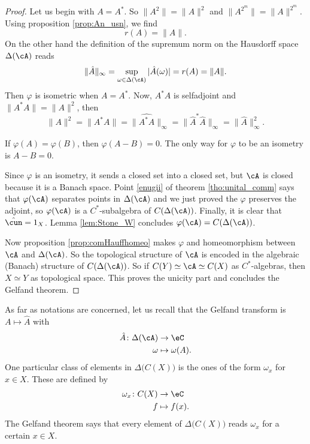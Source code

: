 \begin{proof}

Let us begin with $A=A^*$. So $\|A^2\|=\|A\|^2$ and $\|A^{2^m}\|=\|A\|^{2^m}$. Using proposition \ref{prop:An_usn}, we find
\[ 
  r(A)=\|A\|.
\]
On the other hand the definition of the supremum norm on the Hausdorff space $\Delta(\cA)$ reads
\begin{equation} \label{eq:AinfA }
  \|\hat A\|_{\infty}=\sup_{\omega\in\Delta(\cA)}|\hat A(\omega)|=r(A)=\|A\|.
\end{equation}
Then $\varphi$ is isometric when $A=A^*$. Now, $A^*A$ is selfadjoint and $\|A^*A\|=\|A\|^2$, then
\[ 
\|A\|^2=\|A^*A\|=\|\widehat{A^*A}\|_{\infty}=\|{\hat A}^*\hat A\|_{\infty}=\|\hat A\|^2_{\infty}.
\]


If $\varphi(A)=\varphi(B)$, then $\varphi(A-B)=0$. The only way for $\varphi$ to be an isometry is $A-B=0$.


Since $\varphi$ is an isometry, it sends a closed set into a closed set, but $\cA$ is closed because it is a Banach space. Point \ref{enugii} of theorem \ref{tho:unital_comm} says that $\varphi(\cA)$ separates points in $\Delta(\cA)$ and we just proved the $\varphi$ preserves the adjoint, so $\varphi(\cA)$ is a $C^*$-subalgebra of $C(\Delta(\cA))$. Finally, it is clear that $\hat{\cun}=1_X$. Lemma \ref{lem:Stone_W} concludes $\varphi(\cA)=C(\Delta(\cA))$.

Now proposition \ref{prop:comHauffhomeo} makes $\varphi$ and homeomorphism between $\cA$ and $\Delta(\cA)$. So the topological structure of $\cA$ is encoded in the algebraic (Banach) structure of $C(\Delta(\cA))$. So if $C(Y)\simeq\cA\simeq C(X)$ as $C^*$-algebras, then $X\simeq Y$ as topological space. This proves the unicity part and concludes the Gelfand theorem.

\end{proof}

As far as notations are concerned, let us recall that the Gelfand transform is $A\mapsto\hat A$ with
\begin{equation}
\begin{aligned}
 \hat A\colon \Delta(\cA)&\to \eC \\ 
   \omega&\mapsto \omega(A). 
\end{aligned}
\end{equation}
One particular class of elements in $\Delta\big( C(X) \big)$ is the ones of the form $\omega_x$ for $x\in X$. These are defined by
\begin{equation}
\begin{aligned}
 \omega_x\colon C(X)&\to \eC \\ 
   f&\mapsto f(x). 
\end{aligned}
\end{equation}
The Gelfand theorem says that every element of $\Delta \big(C(X))$ reads $\omega_x$ for a certain $x\in X$.

